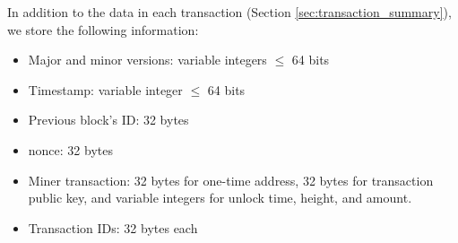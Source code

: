 In addition to the data in each transaction (Section \ref{sec:transaction_summary}), we store the following information:
\begin{itemize}
    \setlength\itemsep{\listspace}
    \item Major and minor versions: variable integers $\leq$ 64 bits
    \item Timestamp: variable integer $\leq$ 64 bits
    \item Previous block's ID: 32 bytes
    \item nonce: 32 bytes
    \item Miner transaction: 32 bytes for one-time address, 32 bytes for transaction public key, and variable integers for unlock time, height, and amount.
    \item Transaction IDs: 32 bytes each
\end{itemize}